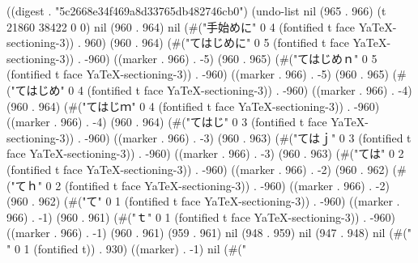 
((digest . "5c2668e34f469a8d33765db482746cb0") (undo-list nil (965 . 966) (t 21860 38422 0 0) nil (960 . 964) nil (#("手始めに" 0 4 (fontified t face YaTeX-sectioning-3)) . 960) (960 . 964) (#("てはじめに" 0 5 (fontified t face YaTeX-sectioning-3)) . -960) ((marker . 966) . -5) (960 . 965) (#("てはじめｎ" 0 5 (fontified t face YaTeX-sectioning-3)) . -960) ((marker . 966) . -5) (960 . 965) (#("てはじめ" 0 4 (fontified t face YaTeX-sectioning-3)) . -960) ((marker . 966) . -4) (960 . 964) (#("てはじｍ" 0 4 (fontified t face YaTeX-sectioning-3)) . -960) ((marker . 966) . -4) (960 . 964) (#("てはじ" 0 3 (fontified t face YaTeX-sectioning-3)) . -960) ((marker . 966) . -3) (960 . 963) (#("てはｊ" 0 3 (fontified t face YaTeX-sectioning-3)) . -960) ((marker . 966) . -3) (960 . 963) (#("ては" 0 2 (fontified t face YaTeX-sectioning-3)) . -960) ((marker . 966) . -2) (960 . 962) (#("てｈ" 0 2 (fontified t face YaTeX-sectioning-3)) . -960) ((marker . 966) . -2) (960 . 962) (#("て" 0 1 (fontified t face YaTeX-sectioning-3)) . -960) ((marker . 966) . -1) (960 . 961) (#("ｔ" 0 1 (fontified t face YaTeX-sectioning-3)) . -960) ((marker . 966) . -1) (960 . 961) (959 . 961) nil (948 . 959) nil (947 . 948) nil (#("
" 0 1 (fontified t)) . 930) ((marker) . -1) nil (#("
